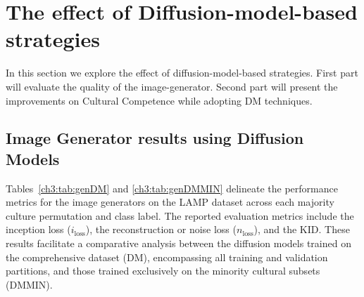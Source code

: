 \section{The effect of Diffusion-model-based strategies}
\label{ch3:sec:diff_model_gen_res}
In this section we explore the effect of diffusion-model-based strategies.
First part will evaluate the quality of the image-generator. 
Second part will present the improvements on Cultural Competence while adopting DM techniques.

\subsection{Image Generator results using Diffusion Models}

Tables~\ref{ch3:tab:genDM} and \ref{ch3:tab:genDMMIN} delineate the performance metrics for the image generators on the LAMP dataset across each majority culture permutation and class label. 
The reported evaluation metrics include the inception loss ($i_{\text{loss}}$), the reconstruction or noise loss ($n_{\text{loss}}$), and the KID. 
These results facilitate a comparative analysis between the diffusion models trained on the comprehensive dataset (DM), encompassing all training and validation partitions, and those trained exclusively on the minority cultural subsets (DMMIN).
%
